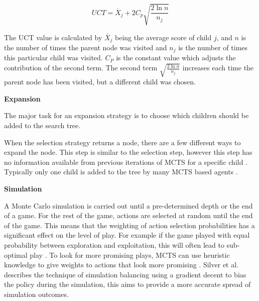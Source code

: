 \documentclass[journal]{IEEEtran}
\begin{document}
			

			\begin{equation} \label{eqUCT}
				 UCT  = \overline{X} _j + 2C _p \sqrt{\frac{ 2 \ln n}{n _j}}
			\end{equation} 
			
			The UCT value is calculated by \( \overline{X} _j\)   being the average score of child \( j \), and \( n \) is the number of times the parent node was visited and \(n _j \) is the number of times this particular child was visited. \( C _P \) is the constant value which adjusts the contribution of the second term. 
			The second term \( \sqrt{\frac{ 2 \ln n}{n _j}} \)  increases each time the parent node has been visited, but a different child was chosen.
			
		
		\textbf{Expansion}
		
			The major task for an expansion strategy is to choose which children should be added to the search tree.
			
			When the selection strategy returns a node, there are a few different ways to expand the node. This step is similar to the selection step, however this step has no information available from previous iterations of MCTS for a specific child \cite{schuster2015mcts}. 
			Typically only one child is added to the tree by many MCTS based agents \cite{chaslot2008monte, schuster2015mcts}. 
			

		\textbf{Simulation}
		
			A Monte Carlo simulation is carried out until a pre-determined depth or the end of a game.
			For the rest of the game, actions are selected at random until the end of the game. This means that the weighting of action selection probabilities has a significant effect on the level of play. For example if the game played with equal probability between exploration and exploitation, this will often lead to sub-optimal play \cite{chaslot2008monte}. 
			To look for more promising plays, MCTS can use heuristic knowledge to give weights to actions that look more promising \cite{perez2014solving}.
			Silver et al. \cite{silver2009monte} describes the technique of simulation balancing using a gradient decent to bias the policy during the simulation, this aims to provide a more accurate spread of simulation outcomes.
\end{document}
